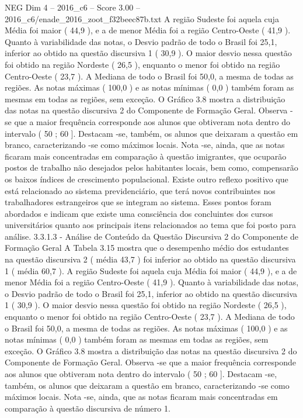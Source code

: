 \begin{textsample}{NEG Dim 4 – 2016\_c6 – Score 3.00 – 2016\_c6/enade\_2016\_zoot\_f32beec87b.txt}
A região Sudeste foi aquela cuja Média foi maior ( 44,9 ), e a de menor Média foi a região Centro-Oeste ( 41,9 ).
Quanto à variabilidade das notas, o Desvio padrão de todo o Brasil foi 25,1, inferior ao obtido na questão discursiva 1 ( 30,9 ).
O maior desvio nessa questão foi obtido na região Nordeste ( 26,5 ), enquanto o menor foi obtido na região Centro-Oeste ( 23,7 ).
A Mediana de todo o Brasil foi 50,0, a mesma de todas as regiões.
As notas máximas ( 100,0 ) e as notas mínimas ( 0,0 ) também foram as mesmas em todas as regiões, sem exceção.
O Gráfico 3.8 mostra a distribuição das notas na questão discursiva 2 do Componente de Formação Geral.
Observa -se que a maior frequência corresponde aos alunos que obtiveram nota dentro do intervalo ( 50 ; 60 ].
Destacam -se, também, os alunos que deixaram a questão em branco, caracterizando -se como máximos locais.
Nota -se, ainda, que as notas ficaram mais concentradas em comparação à questão imigrantes, que ocuparão postos de trabalho não desejados pelos habitantes locais, bem como, compensarão os baixos índices de crescimento populacional.
Existe outro reflexo positivo que está relacionado ao sistema previdenciário, que terá novos contribuintes nos trabalhadores estrangeiros que se integram ao sistema.
Esses pontos foram abordados e indicam que existe uma consciência dos concluintes dos cursos universitários quanto aos principais itens relacionados ao tema que foi posto para análise. 3.3.1.3 - Análise de Conteúdo da Questão Discursiva 2 do Componente de Formação Geral A Tabela 3.15 mostra que o desempenho médio dos estudantes na questão discursiva 2 ( média 43,7 ) foi inferior ao obtido na questão discursiva 1 ( média 60,7 ).
A região Sudeste foi aquela cuja Média foi maior ( 44,9 ), e a de menor Média foi a região Centro-Oeste ( 41,9 ).
Quanto à variabilidade das notas, o Desvio padrão de todo o Brasil foi 25,1, inferior ao obtido na questão discursiva 1 ( 30,9 ).
O maior desvio nessa questão foi obtido na região Nordeste ( 26,5 ), enquanto o menor foi obtido na região Centro-Oeste ( 23,7 ).
A Mediana de todo o Brasil foi 50,0, a mesma de todas as regiões.
As notas máximas ( 100,0 ) e as notas mínimas ( 0,0 ) também foram as mesmas em todas as regiões, sem exceção.
O Gráfico 3.8 mostra a distribuição das notas na questão discursiva 2 do Componente de Formação Geral.
Observa -se que a maior frequência corresponde aos alunos que obtiveram nota dentro do intervalo ( 50 ; 60 ].
Destacam -se, também, os alunos que deixaram a questão em branco, caracterizando -se como máximos locais.
Nota -se, ainda, que as notas ficaram mais concentradas em comparação à questão discursiva de número 1.

\end{textsample}
